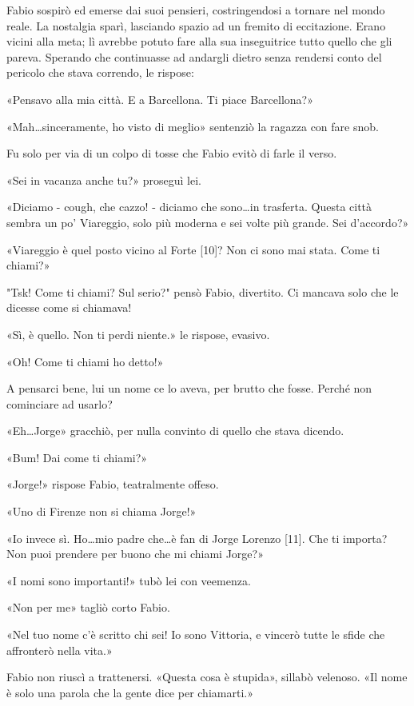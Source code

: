 Fabio sospirò ed emerse dai suoi pensieri, costringendosi a tornare nel mondo reale. La nostalgia sparì, lasciando spazio ad un fremito di eccitazione. Erano vicini alla meta; lì avrebbe potuto fare alla sua inseguitrice tutto quello che gli pareva. Sperando che continuasse ad andargli dietro senza rendersi conto del pericolo che stava correndo, le rispose:

«Pensavo alla mia città. E a Barcellona. Ti piace Barcellona?»

«Mah\ldots sinceramente, ho visto di meglio» sentenziò la ragazza con fare snob.

Fu solo per via di un colpo di tosse che Fabio evitò di farle il verso.

«Sei in vacanza anche tu?» proseguì lei.

«Diciamo - cough, che cazzo! - diciamo che sono\ldots in trasferta. Questa città sembra un po' Viareggio, solo più moderna e sei volte più grande. Sei d'accordo?»

«Viareggio è quel posto vicino al Forte [10]? Non ci sono mai stata. Come ti chiami?»

"Tsk! Come ti chiami? Sul serio?" pensò Fabio, divertito. Ci mancava solo che le dicesse come si chiamava!

«Sì, è quello. Non ti perdi niente.» le rispose, evasivo.

«Oh! Come ti chiami ho detto!»

A pensarci bene, lui un nome ce lo aveva, per brutto che fosse. Perché non cominciare ad usarlo?

«Eh\ldots Jorge» gracchiò, per nulla convinto di quello che stava dicendo.

«Bum! Dai come ti chiami?»

«Jorge!» rispose Fabio, teatralmente offeso.

«Uno di Firenze non si chiama Jorge!»

«Io invece sì. Ho\ldots mio padre che\ldots è fan di Jorge Lorenzo [11]. Che ti importa? Non puoi prendere per buono che mi chiami Jorge?»

«I nomi sono importanti!» tubò lei con veemenza.

«Non per me» tagliò corto Fabio.

«Nel tuo nome c'è scritto chi sei! Io sono Vittoria, e vincerò tutte le sfide che affronterò nella vita.»

Fabio non riuscì a trattenersi. «Questa cosa è stupida», sillabò velenoso. «Il nome è solo una parola che la gente dice per chiamarti.»

